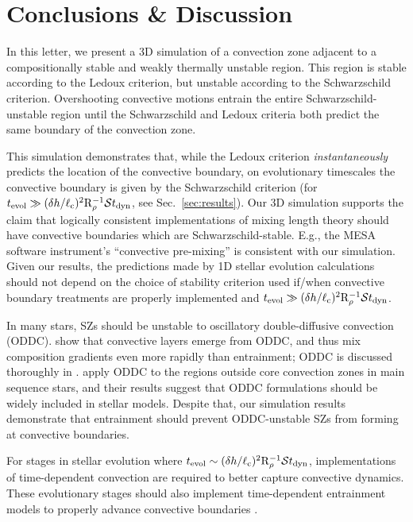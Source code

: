 \section{Conclusions \& Discussion}
\label{sec:conclusions}

In this letter, we present a 3D simulation of a convection zone adjacent to a compositionally stable and weakly thermally unstable region.
This region is stable according to the Ledoux criterion, but unstable according to the Schwarzschild criterion.
Overshooting convective motions entrain the entire Schwarzschild-unstable region until the Schwarzschild and Ledoux criteria both predict the same boundary of the convection zone.

This simulation demonstrates that, while the Ledoux criterion \emph{instantaneously} predicts the location of the convective boundary, on evolutionary timescales the convective boundary is given by the Schwarzschild criterion (for $t_{\rm{evol}} \gg (\delta h / \ell_{\rm{c}})^2\mathrm{R}_{\rho}^{-1}\mathcal{S} t_{\rm{dyn}}$, see Sec.~\ref{sec:results}).
Our 3D simulation supports the claim that logically consistent implementations of mixing length theory \citep{gabriel_etal_2014, mesa4, mesa5} should have convective boundaries which are Schwarzschild-stable.
E.g., the MESA software instrument's ``convective pre-mixing'' \citep[CPM,][]{mesa5} is consistent with our simulation.
Given our results, the predictions made by 1D stellar evolution calculations should not depend on the choice of stability criterion used if/when convective boundary treatments are properly implemented and $t_{\rm{evol}} \gg (\delta h / \ell_{\rm{c}})^2\mathrm{R}_{\rho}^{-1}\mathcal{S} t_{\rm{dyn}}$.

In many stars, SZs should be unstable to oscillatory double-diffusive convection (ODDC).
\citet{mirouh_etal_2012} show that convective layers emerge from ODDC, and thus mix composition gradients even more rapidly than entrainment; ODDC is discussed thoroughly in \citet{garaud_2018}.
\citet{moore_garaud_2016} apply ODDC to the regions outside core convection zones in main sequence stars, and their results suggest that ODDC formulations should be widely included in stellar models.
Despite that, our simulation results demonstrate that entrainment should prevent ODDC-unstable SZs from forming at convective boundaries.

For stages in stellar evolution where ${t_{\rm{evol}} \sim (\delta h / \ell_{\rm{c}})^2\mathrm{R}_{\rho}^{-1}\mathcal{S} t_{\rm{dyn}}}$, implementations of time-dependent convection \citep[TDC,][]{tdc_1986} are required to better capture convective dynamics.
These evolutionary stages should also implement time-dependent entrainment models to properly advance convective boundaries \citep[e.g.,][]{turner_1968, fuentes_cumming_2020}.

